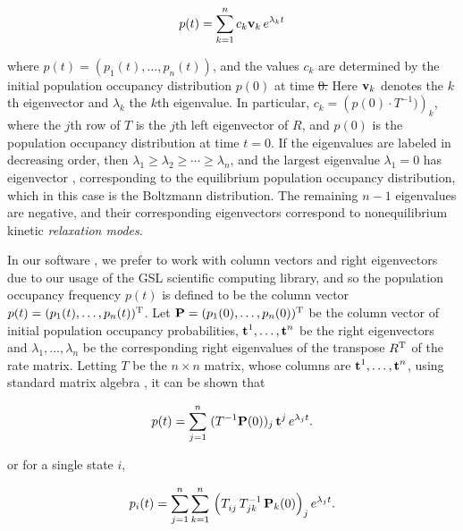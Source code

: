 \documentclass[11pt, oneside]{Thesis} %
\providecommand{\DIFadd}[1]{{\protect\color{blue}\uwave{#1}}} %
\providecommand{\DIFdel}[1]{{\protect\color{red}\sout{#1}}}                      %
\providecommand{\DIFaddbegin}{} %
\providecommand{\DIFaddend}{} %
\providecommand{\DIFdelbegin}{} %
\providecommand{\DIFdelend}{} %
\begin{document}
\begin{align}
\label{eq:hermes:populationOccupancyEquation}
p(t) = \sum_{k=1}^n c_k {\bf v}_k\, e^{\lambda_k t}
\end{align}

where $p(t) = (p_1(t),\dots,p_n(t))$, and the
values $c_k$ are determined by the initial population occupancy
distribution $p(0)$ at time \DIFdelbegin \DIFdel{0. }\DIFdelend \DIFaddbegin \DIFadd{$0$. }\DIFaddend Here
${\bf v}_k$ denotes the $k$th eigenvector and
$\lambda_k$ the $k$th eigenvalue. In particular,
\DIFdelbegin \DIFdel{$c_k = \left(p(0) \cdot T^{-1})\right)_k$}\DIFdelend \DIFaddbegin \DIFadd{$c_k = \left(p(0) \cdot T^{-1}\right)_k$}\DIFaddend , where the $j$th row of $T$
is the $j$th left eigenvector of $R$,
and $p(0)$ is the population occupancy distribution
at time $t=0$. If the eigenvalues are labeled in decreasing
order, then $\lambda_1 \geq \lambda_2 \geq \cdots \geq \lambda_n$,
and the largest eigenvalue $\lambda_1=0$ has eigenvector \pSt, corresponding
to the equilibrium population occupancy distribution, which in this case
is the Boltzmann distribution. The
remaining $n-1$ eigenvalues are negative, and their corresponding eigenvectors
correspond to nonequilibrium kinetic {\em relaxation modes}.

In our software \hermes, we prefer to work with column vectors and
right eigenvectors due to our usage of the GSL scientific computing library,
and so the population occupancy frequency
$p(t)$ is defined to be the column vector
$p(t)=(p_1(t),\dots,p_n(t))^{\text T}$. Let
$\mbox{\bf P} = (p_1(0),\dots,p_n(0))^{\text T}$ be the column vector of initial
population occupancy probabilities,
$\mbox{\bf t}^1,\dots,\mbox{\bf t}^n$ be the right eigenvectors and
$\lambda_1,\dots,\lambda_n$ be the corresponding right eigenvalues of the
transpose $R^{\text T}$ of the rate matrix.
Letting $T$ be the $n\times n$ matrix, whose columns are
$\mbox{\bf t}^1,\dots,\mbox{\bf t}^n$, using standard matrix algebra
\citep{matrixtheory}, it can be shown that

\begin{align}
\label{eq:hermes:solutionMasterEquation}
p(t) = \sum_{j=1}^n\; (T^{-1}
\mathbbP(0))_j\, \mathbbt^j\, e^{\lambda_j t}.
\end{align}

or for a single state $i$,

\begin{align}
\label{eq:hermes:solutionMasterEquationForSingleState}
p_i(t) = \sum_{j=1}^n \sum_{k=1}^n\, \left(
T_{ij}^{\vphantom{-1}}\, T_{jk}^{-1}\, \mathbbP_k(0)
\right)_j e^{\lambda_j t}.
\end{align}
\end{document}
